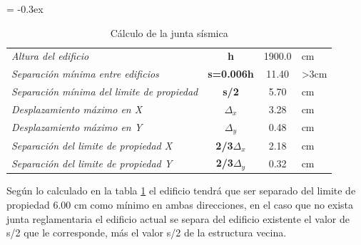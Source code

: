 \documentclass{article}%
\begin{document}
%


\begin{table}[H]%
\centering%
\caption{Cálculo de la junta sísmica}%
\extrarowheight = -0.3ex%
\renewcommand{\arraystretch}{1.5}%
\begin{tabular}{l|c|c|l}%
\cline{2-3}%
\textit{Altura del edificio} & \textbf{h} & {1900.0} & {cm} \\%
\cline{2-3}%
\textit{Separación mínima entre edificios} & \textbf{s=0.006h} & {11.40} & {>3cm} \\%
\cline{2-3}%
\textit{Separación mínima del limite de propiedad} & \textbf{s/2} & {5.70} & {cm} \\%
\cline{2-3}%
\textit{Desplazamiento máximo en X} & \textbf{$\Delta_x$} & {3.28} & {cm} \\%
\cline{2-3}%
\textit{Desplazamiento máximo en Y} & \textbf{$\Delta_y$} & {0.48} & {cm} \\%
\cline{2-3}%
\textit{Separación del limite de propiedad X} & \textbf{2/3$\Delta_{x}$} & {2.18} & {cm} \\%
\cline{2-3}%
\textit{Separación del limite de propiedad Y} & \textbf{2/3$\Delta_{y}$} & {0.32} & {cm} \\%
\cline{2-3}%
\end{tabular}%
\label{tab:junta_sis}%
\end{table}

%
Según lo calculado en la tabla \ref{tab:junta_sis} %
 el edificio tendrá que ser separado del limite de propiedad 6.00 cm como mínimo en ambas direcciones, en el caso que no exista junta reglamentaria el edificio actual se separa del edificio existente el valor de s/2 que le corresponde, más el valor s/2 de la estructura vecina.

%
\end{document}
